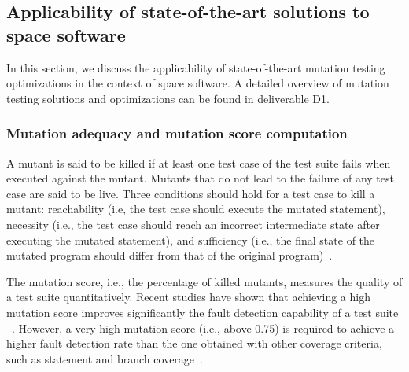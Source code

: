 
\subsection{Applicability of state-of-the-art solutions to space software}

In this section, we discuss the applicability of state-of-the-art mutation testing optimizations in the context of space software. A detailed overview of mutation testing solutions and optimizations can be found in deliverable D1.

\subsubsection{Mutation adequacy and mutation score computation}

A mutant is said to be killed if at least one test case of the test suite fails when executed against the mutant.
Mutants that do not lead to the failure of any test case are said to be live.
Three conditions should hold for a test case to kill a mutant: reachability (i.e, the test case should execute the mutated statement), necessity (i.e., the test case should reach an incorrect intermediate state after executing the mutated statement), and sufficiency (i.e., the final state of the mutated program should differ from that of the original program)~\cite{offutt1997automatically}.

The mutation score, i.e., the percentage of killed mutants, measures the quality of a test suite quantitatively. Recent studies have shown that achieving a high mutation score improves significantly the fault detection capability of a test suite
~\cite{papadakis2018mutation}.
However, a very high mutation score (i.e., above 0.75) is required to achieve a higher fault detection rate than the one obtained with other coverage criteria, such as statement and branch coverage~\cite{Chekam:17}.

